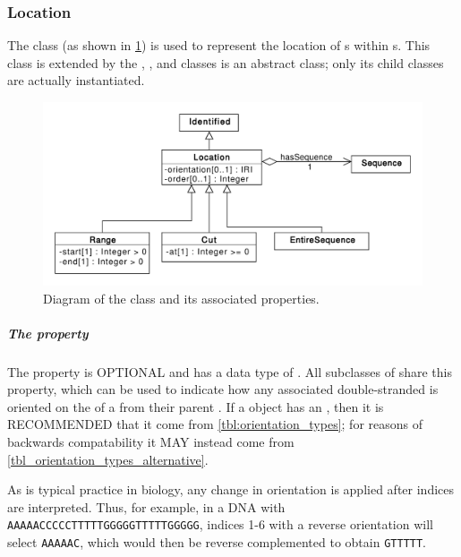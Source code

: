 \subsubsection{Location}
\label{sec:Location}

The  class (as shown in \ref{uml:location}) is used to represent the location of s within s.  This class is extended by the , , and  classes
 is an abstract class; only its child classes are actually instantiated.

\begin{figure}[ht]
\begin{center}
\includegraphics[scale=0.6]{uml/location}
\caption[]{Diagram of the  class and its associated properties.}
\label{uml:location}
\end{center}
\end{figure} 

\subparagraph{The  property}
\label{sec:orientation:L}
The  property is OPTIONAL and has a data type of . All subclasses of  share this property, which can be used to indicate how any associated double-stranded  is oriented on the  of a  from their parent .
If a  object has an , then it is RECOMMENDED that it come from \ref{tbl:orientation_types}; for reasons of backwards compatability it MAY instead come from \ref{tbl_orientation_types_alternative}.


As is typical practice in biology, any change in orientation is applied after indices are interpreted.
Thus, for example, in a DNA  with  {\tt AAAAACCCCCTTTTTGGGGGTTTTTGGGGG}, 
indices 1-6 with a reverse orientation will select {\tt AAAAAC}, which would then be reverse complemented to obtain {\tt GTTTTT}.

